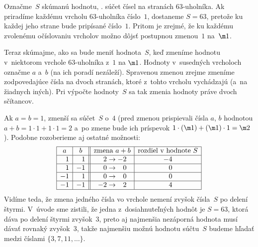 {%
Označme~$S$ skúmanú hodnotu, \tj. súčet čísel na stranách 63-uholníka.
Ak priradíme každému vrcholu 63-uholníka číslo~$1$, dostaneme
$S = 63$, pretože ku každej jeho strane bude pripísané číslo~$1$.
Pritom je zrejmé, že ku každému zvolenému očíslovaniu vrcholov možno dôjsť
postupnou zmenou~$1$ na~$\m1$.

Teraz skúmajme, ako sa bude meniť hodnota~$S$, keď zmeníme hodnotu
v~niektorom vrchole 63-uholníka z~$1$ na $\m1$. Hodnoty v~susedných vrcholoch
označme $a$ a~$b$ (na ich poradí nezáleží). Spravenou zmenou zrejme zmeníme
zodpovedajúce čísla na dvoch stranách, ktoré z~tohto vrcholu vychádzajú (a~na žiadnych
iných). Pri výpočte hodnoty~$S$ sa tak zmenia hodnoty práve dvoch sčítancov.

Ak $a = b= 1$, zmenší sa súčet~$S$ o~$4$
(pred zmenou prispievali čísla $a$, $b$ hodnotou $a + b = 1 \cdot
1 +1 \cdot 1 = 2$ a~po zmene bude ich príspevok $1 \cdot (\m1) + (\m1) \cdot
1 = \m2$). Podobne rozoberieme aj ostatné možnosti:
$$
\vbox{\let\\=\cr\everycr{\noalign{\hrule}}\offinterlineskip
 \def\@{\phantom{+}}\def\q{\omit\,\vrule}
 \halign{\vrule#\strut&&\hss\enspace#\unskip\enspace\hss\vrule\cr
&$a$  & $b$   &\q& zmena $a+b$     &rozdiel v~hodnote $S$ \\
&\@1   & \@1    &\q&$\@2\rightarrow -2$ & $-4$\\
&\@1   &$-1$   &\q&$\@0\rightarrow \@0$ & \@0\\
&$-1$ &$\@1$   &\q&$\@0\rightarrow \@0$ & \@0\\
&$-1$ &$-1$   &\q&$-2\rightarrow \@2$ & \@4\\
}}
$$
Vidíme teda, že zmena jedného čísla vo vrchole
nemení zvyšok čísla~$S$ po delení štyrmi. V~úvode sme zistili, že
jedna z~dosiahnuteľných hodnôt je $S = 63$, ktorá dáva po
delení štyrmi zvyšok~$3$, preto aj najmenšia nezáporná hodnota musí dávať rovnaký
zvyšok~$3$, takže najmenšiu možnú hodnotu súčtu~$S$ budeme hľadať medzi číslami
$\{3,7,11,\dots\}$.

}
